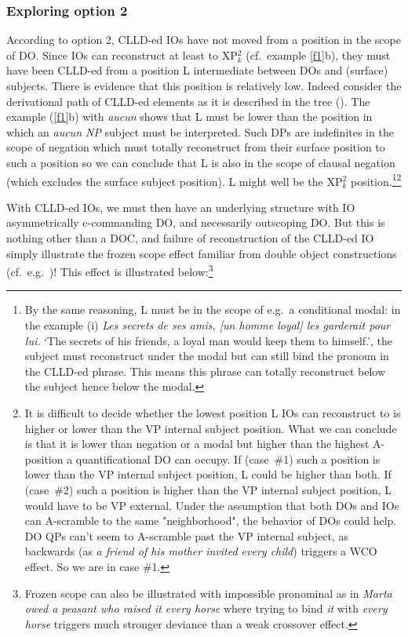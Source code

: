 \documentclass[output=paper]{langsci/langscibook}
\begin{document}
\subsubsection{Exploring option 2} According to option 2, \gls{CLLD}-ed \glspl{IO}
have not moved from a position in the scope of DO. Since \glspl{IO} can
reconstruct at least to XP$_k^2$ (cf.\ example \ref{f1}b), they must have
been \gls{CLLD}-ed from a position L intermediate between \glspl{DO} and
(surface) subjects. There is evidence that this position is relatively low.
Indeed consider the derivational path of \gls{CLLD}-ed elements as it is
described in the tree (). The example (\ref{f1}b) with {\it aucun}
shows that L must be lower than the position in which an {\it aucun NP} subject
must be interpreted. Such DPs are indefinites in the scope of negation which
must totally reconstruct from their surface position to such a position so we
can conclude that L is also in the scope of clausal negation (which excludes
the surface subject position). L might well be the XP$_k^2$
position.\footnote{By the same reasoning, L must be in the scope of e.g.\ a
    conditional modal: in the example (i) \emph{Les secrets de
    ses amis, [un homme loyal] les garderait pour
lui.} \enquote*{The secrets of his friends, a loyal man would keep them to
himself.}, the subject must reconstruct under the modal but can still bind the
pronoun in the CLLD-ed  phrase. This means this phrase can totally reconstruct
below the subject hence below the modal.}\multiplefootnoteseparator\footnote{It
is difficult to decide whether the lowest position L \glspl{IO} can reconstruct
to is higher or lower than the VP internal subject position. What we can
conclude is that it is lower than negation or a modal but higher than the
highest A-position a quantificational DO can occupy. If (case~\#1) such a
position is lower than the VP internal subject position, L could be higher than
both.  If (case~\#2) such a position is higher  than the VP internal subject
position, L would have to be VP external.  Under the assumption that both
\glspl{DO} and \glspl{IO} can A-scramble to the same "neighborhood", the
behavior of \glspl{DO} could help. DO QPs can't seem to A-scramble past the VP
internal subject, as backwards   (as {\it a friend of
his mother invited every child}) triggers a
\gls{WCO} effect. So we are in case \#1.}

With \gls{CLLD}-ed \glspl{IO}, we must then have an underlying structure with
IO asymmetrically c-commanding DO, and necessarily outscoping DO. But this is
nothing other than a DOC, and failure of reconstruction of the \gls{CLLD}-ed IO
simply illustrate the frozen scope effect familiar from  double
object constructions (cf.\ e.g.\ \citealt{Larson:1988})! This effect is illustrated
below:\footnote{Frozen scope can also be illustrated with  impossible
    pronominal  as in {\it Marta owed a peasant who raised it every
    horse} where trying to bind {\it it} with {\it every  horse} triggers much
stronger deviance than a weak crossover effect.}
\end{document}
